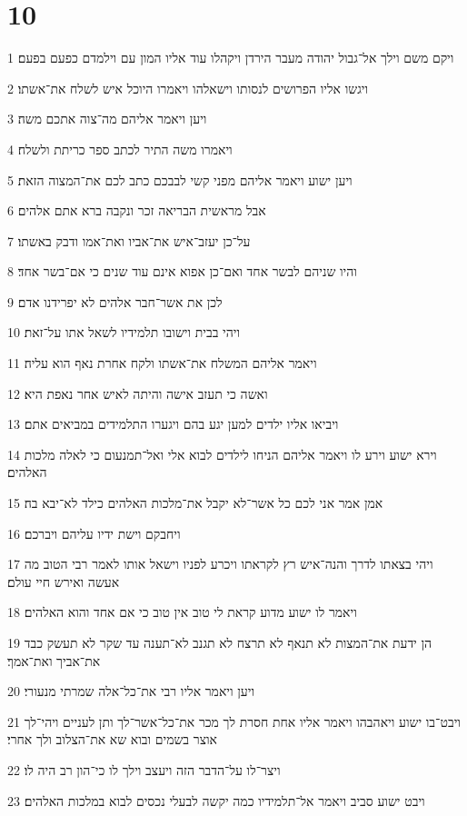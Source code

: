 \chapter{10}

\par 1 ויקם משם וילך אל־גבול יהודה מעבר הירדן ויקהלו עוד אליו המון עם וילמדם כפעם בפעם׃
\par 2 ויגשו אליו הפרושים לנסותו וישאלהו ויאמרו היוכל איש לשלח את־אשתו׃
\par 3 ויען ויאמר אליהם מה־צוה אתכם משה׃
\par 4 ויאמרו משה התיר לכתב ספר כריתת ולשלח׃
\par 5 ויען ישוע ויאמר אליהם מפני קשי לבבכם כתב לכם את־המצוה הזאת׃
\par 6 אבל מראשית הבריאה זכר ונקבה ברא אתם אלהים׃
\par 7 על־כן יעזב־איש את־אביו ואת־אמו ודבק באשתו׃
\par 8 והיו שניהם לבשר אחד ואם־כן אפוא אינם עוד שנים כי אם־בשר אחד׃
\par 9 לכן את אשר־חבר אלהים לא יפרידנו אדם׃
\par 10 ויהי בבית וישובו תלמידיו לשאל אתו על־זאת׃
\par 11 ויאמר אליהם המשלח את־אשתו ולקח אחרת נאף הוא עליה׃
\par 12 ואשה כי תעזב אישה והיתה לאיש אחר נאפת היא׃
\par 13 ויביאו אליו ילדים למען יגע בהם ויגערו התלמידים במביאים אתם׃
\par 14 וירא ישוע וירע לו ויאמר אליהם הניחו לילדים לבוא אלי ואל־תמנעום כי לאלה מלכות האלהים׃
\par 15 אמן אמר אני לכם כל אשר־לא יקבל את־מלכות האלהים כילד לא־יבא בה׃
\par 16 ויחבקם וישת ידיו עליהם ויברכם׃
\par 17 ויהי בצאתו לדרך והנה־איש רץ לקראתו ויכרע לפניו וישאל אותו לאמר רבי הטוב מה אעשה ואירש חיי עולם׃
\par 18 ויאמר לו ישוע מדוע קראת לי טוב אין טוב כי אם אחד והוא האלהים׃
\par 19 הן ידעת את־המצות לא תנאף לא תרצח לא תגנב לא־תענה עד שקר לא תעשק כבד את־אביך ואת־אמך׃
\par 20 ויען ויאמר אליו רבי את־כל־אלה שמרתי מנעורי׃
\par 21 ויבט־בו ישוע ויאהבהו ויאמר אליו אחת חסרת לך מכר את־כל־אשר־לך ותן לעניים ויהי־לך אוצר בשמים ובוא שא את־הצלוב ולך אחרי׃
\par 22 ויצר־לו על־הדבר הזה ויעצב וילך לו כי־הון רב היה לו׃
\par 23 ויבט ישוע סביב ויאמר אל־תלמידיו כמה יקשה לבעלי נכסים לבוא במלכות האלהים׃
